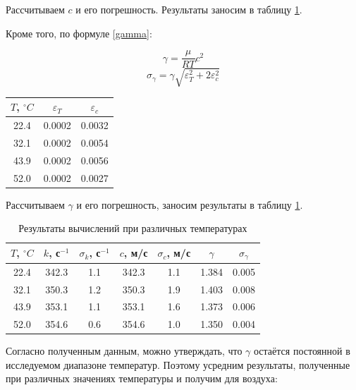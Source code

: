 \documentclass{article}
\begin{document}
\noindent Рассчитываем $c$ и его погрешность. Результаты заносим в таблицу \ref{tab:resConstL}.

Кроме того, по формуле \eqref{gamma}:

$$\gamma = \frac{\mu}{RT}c^2$$
$$\sigma_\gamma = \gamma\sqrt{\varepsilon_T^2+ 2\varepsilon_c^2}$$
\begin{table}[h!]
	\centering
	\begin{tabular}{|c|c|c|}
		\hline
		$ T $, $^{\circ}C$ & $\varepsilon_T$ & $\varepsilon_c$ \\ \hline
		22.4               & 0.0002          & 0.0032          \\ \hline
		32.1               & 0.0002          & 0.0054          \\ \hline
		43.9               & 0.0002          & 0.0056          \\ \hline
		52.0               & 0.0002          & 0.0027          \\ \hline
	\end{tabular}
\end{table}

\noindent Рассчитываем $\gamma$ и его погрешность, заносим результаты в таблицу \ref{tab:resConstL}.

\begin{table}[h!]
	\centering
	\begin{tabular}{|c|c|c|c|c|c|c|}
		\hline
		$ T $, $^{\circ}C$ & $k$, с$^{-1} $ & $ \sigma_k $, с$^{-1} $ & $c$, м/с & $\sigma_c$, м/с & $\gamma$ & $\sigma_\gamma$ \\ \hline
		22.4               & 342.3          & 1.1                     & 342.3    & 1.1             & 1.384    & 0.005           \\ \hline
		32.1               & 350.3          & 1.2                     & 350.3    & 1.9             & 1.403    & 0.008           \\ \hline
		43.9               & 353.1          & 1.1                     & 353.1    & 1.6             & 1.373    & 0.006           \\ \hline
		52.0               & 354.6          & 0.6                     & 354.6    & 1.0             & 1.350    & 0.004           \\ \hline
	\end{tabular}
	\caption{Результаты вычислений при различных температурах}
	\label{tab:resConstL}
\end{table}

Согласно полученным данным, можно утверждать, что $ \gamma $ остаётся постоянной в исследуемом диапазоне температур. Поэтому усредним результаты, полученные при различных значениях температуры и получим для воздуха:
\end{document}
